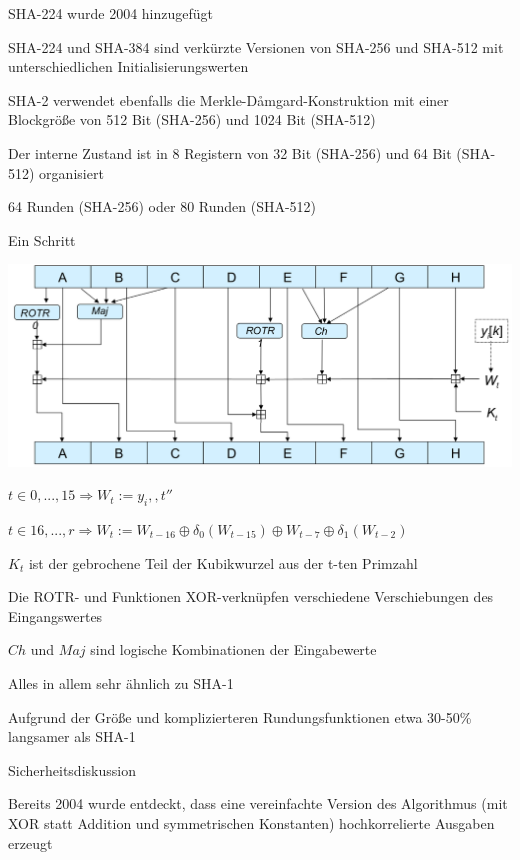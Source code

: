 \documentclass[a4paper]{article}
\begin{document}
\begin{multicols}{3}
\begin{itemize*}
\begin{itemize*}
                  \item SHA-224 wurde 2004 hinzugefügt
                  \item SHA-224 und SHA-384 sind verkürzte Versionen von SHA-256 und SHA-512 mit unterschiedlichen Initialisierungswerten
                  \item SHA-2 verwendet ebenfalls die Merkle-Dåmgard-Konstruktion mit einer Blockgröße von 512 Bit (SHA-256) und 1024 Bit (SHA-512)
                  \item Der interne Zustand ist in 8 Registern von 32 Bit (SHA-256) und 64 Bit (SHA-512) organisiert
                  \item 64 Runden (SHA-256) oder 80 Runden (SHA-512)
                  \item Ein Schritt
                  \begin{itemize*}
                        \item \includegraphics[width=.5\linewidth]{Assets/NetworkSecurity-sha-2.png}
                        \item $t\in{0, ..., 15}\Rightarrow W_t:=y_i,,t''$
                        \item $t\in{16, ..., r}\Rightarrow W_t:=W_{t-16}\oplus \delta_0(W_{t-15})\oplus W_{t-7}\oplus\delta_1(W_{t-2})$
                        \item $K_t$ ist der gebrochene Teil der Kubikwurzel aus der t-ten Primzahl
                        \item Die ROTR- und Funktionen XOR-verknüpfen verschiedene Verschiebungen des Eingangswertes
                        \item $Ch$ und $Maj$ sind logische Kombinationen der Eingabewerte
                  \end{itemize*}
                  \item Alles in allem sehr ähnlich zu SHA-1
                  \item Aufgrund der Größe und komplizierteren Rundungsfunktionen etwa 30-50\% langsamer als SHA-1
                  \item Sicherheitsdiskussion
                  \begin{itemize*}
                        \item Bereits 2004 wurde entdeckt, dass eine vereinfachte Version des Algorithmus (mit XOR statt Addition und symmetrischen Konstanten) hochkorrelierte Ausgaben erzeugt

\end{itemize*}
\end{itemize*}
\end{itemize*}
\end{multicols}
\end{document}
